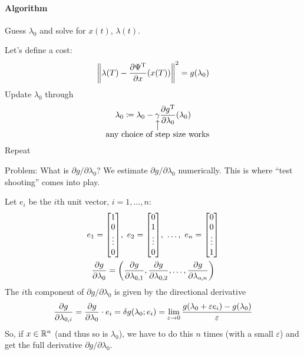 \paragraph{Algorithm}
Guess $\lambda_0$ and solve for $x(t)$, $\lambda(t)$.
\begin{center}
\end{center}
Let's define a cost:
\[ \left\Vert \lambda(T) - \frac{\partial \Psi^\text{T}}{\partial x}(x(T)) \right\Vert^2 = g(\lambda_0) \]
Update $\lambda_0$ through
\[ \lambda_0 \coloneqq \lambda_0 - \underset{\mathclap{\substack{\big\uparrow\\ \text{\normalsize any choice of step size works}}}}{\gamma} \pder{g\trans}{\lambda_0}(\lambda_0) \]
Repeat

\medskip

\noindent
Problem: What is $\partial g/\partial\lambda_0$? We estimate $\partial g/\partial\lambda_0$ numerically. This is where ``test shooting'' comes into play.

Let $e_i$ be the $i$th unit vector, $i=1,\dots,n$:
\begin{gather}
  e_1 = \begin{bmatrix}
    1 \\ 0 \\ \vdots \\ 0
  \end{bmatrix}\!,\ 
  e_2 = \begin{bmatrix}
    0 \\ 1 \\ \vdots \\ 0
  \end{bmatrix}\!,\ 
  \dots,\ 
  e_n = \begin{bmatrix}
    0 \\ 0 \\ \vdots \\ 1
  \end{bmatrix} \\
  \pder{g}{\lambda_0} = \left( \pder{g}{\lambda_{0,1}},\pder{g}{\lambda_{0,2}},\dots,\pder{g}{\lambda_{o,n}} \right)
\end{gather}
The $i$th component of $\partial g/\partial\lambda_0$ is given by the directional derivative
\[
  \frac{\partial g}{\partial \lambda_{0,i}} = \frac{\partial g}{\partial \lambda_0} \cdot e_i = \delta g(\lambda_0;e_i) = \lim_{\varepsilon\to0} \frac{g(\lambda_0+\varepsilon e_i) - g(\lambda_0)}{\varepsilon}
\]
So, if $x\in\mathbb{R}^n$ (and thus so is $\lambda_0$), we have to do this $n$ times (with a small $\varepsilon$) and get the full derivative $\partial g/\partial\lambda_0$.

